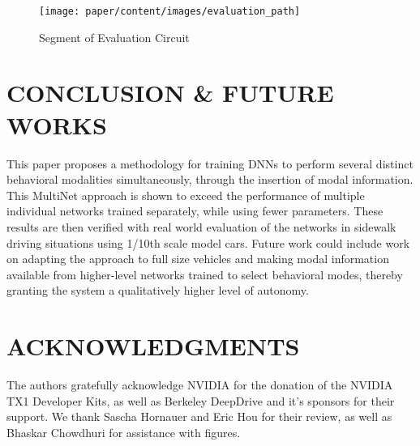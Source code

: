 \begin{figure}[t]
\centering
\texttt{[image: paper/content/images/evaluation\_path]}
\caption{Segment of Evaluation Circuit}
\label{fig:evalpath}
\end{figure}

\section{CONCLUSION \& FUTURE WORKS}
\label{sec:conclusion}
This paper proposes a methodology for training DNNs to perform several distinct behavioral modalities simultaneously, through the insertion of modal information. This MultiNet approach is shown to exceed the performance of multiple individual networks trained separately, while using fewer parameters. These results are then verified with real world evaluation of the networks in sidewalk driving situations using 1/10th scale model cars. Future work could include work on adapting the approach to full size vehicles and making modal information available from higher-level networks trained to select behavioral modes, thereby granting the system a qualitatively higher level of autonomy.

\section*{ACKNOWLEDGMENTS}
The authors gratefully acknowledge NVIDIA for the donation of the NVIDIA TX1 Developer Kits, as well as Berkeley DeepDrive and it's sponsors for their support. We thank Sascha Hornauer and Eric Hou for their review, as well as Bhaskar Chowdhuri for assistance with figures.